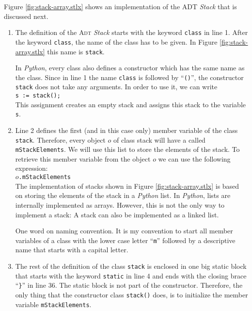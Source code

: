 Figure \ref{fig:stack-array.stlx} shows an implementation of the ADT \textsl{Stack} that is 
discussed next.
\begin{enumerate}
\item The definition of the \textsc{Adt} \textsl{Stack} starts with the keyword \texttt{class}
      in line 1.
      After the keyword \texttt{class}, the name of the class has to be given.  In Figure
      \ref{fig:stack-array.stlx} this name is \texttt{stack}.

      In \textsl{Python}, every class also defines a constructor which has the same name as the class.
      Since in line 1 the name \texttt{class} is followed by ``\texttt{()}'', the constructor
      \texttt{stack} does not take any arguments.  In order to use it, we can write
      \\[0.2cm]
      \hspace*{1.3cm}
      \texttt{s := stack();}
      \\[0.2cm]
      This assignment creates an empty stack and assigns this stack to the variable \texttt{s}.
\item Line 2 defines the first (and in this case only) member variable of the class \texttt{stack}.
      Therefore, every object $o$ of class stack will have a  called
      \texttt{mStackElements}. 
      We will use this list to store the elements of the stack.  To retrieve this member variable from
      the object $o$ we can use the following expression:
      \\[0.2cm]
      \hspace*{1.3cm}
      $o$\texttt{.mStackElements}
      \\[0.2cm]
      The implementation of stacks shown
      in Figure \ref{fig:stack-array.stlx} is based on storing the elements of the stack in a
      \textsl{Python} list.  In \textsl{Python}, lists are internally implemented as arrays.  However,
      this is not the only way to implement a stack: A stack can also be implemented as a linked list.

      One word on naming convention.  It is my convention to start all member variables of a class
      with the lower case letter ``\texttt{m}'' followed by a descriptive name that starts with a 
      capital letter.
\item The rest of the definition of the class \texttt{stack} is enclosed in one big static
      block that starts with the keyword \texttt{static} in line 4 and ends with the closing brace 
      ``\texttt{\}}'' in line 36.  The static block is not part of the constructor.
      Therefore, the only thing that the constructor class
      \texttt{stack()} does, is to initialize the member variable \texttt{mStackElements}.


\end{enumerate}
